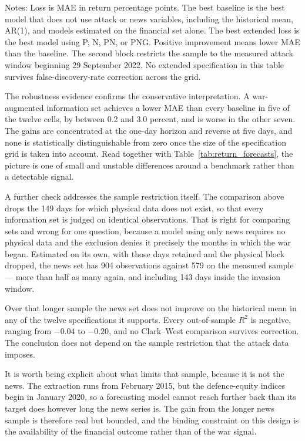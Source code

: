 \documentclass[12pt,a4paper]{article}
\begin{document}
\begin{table}[H]
\begin{threeparttable}
\begin{tablenotes}
\small
\item Notes: Loss is MAE in return percentage points. The best baseline is
the best model that does not use attack or news variables, including the
historical mean, AR(1), and models estimated on the financial set alone. The
best extended loss is the best model using P, N, PN, or PNG. Positive
improvement means lower MAE than the baseline. The second block restricts the
sample to the measured attack window beginning 29 September 2022. No extended
specification in this table survives false-discovery-rate correction across the
grid.
\end{tablenotes}

\end{threeparttable}
\end{table}

The robustness evidence confirms the conservative interpretation. A war-augmented information set achieves a lower MAE than every baseline in five of the twelve cells, by between 0.2 and 3.0 percent, and is worse in the other seven. The gains are concentrated at the one-day horizon and reverse at five days, and none is statistically distinguishable from zero once the size of the specification grid is taken into account. Read together with Table~\ref{tab:return_forecasts}, the picture is one of small and unstable differences around a benchmark rather than a detectable signal.

A further check addresses the sample restriction itself. The comparison above drops the 149 days for which physical data does not exist, so that every information set is judged on identical observations. That is right for comparing sets and wrong for one question, because a model using only news requires no physical data and the exclusion denies it precisely the months in which the war began. Estimated on its own, with those days retained and the physical block dropped, the news set has 904 observations against 579 on the measured sample --- more than half as many again, and including 143 days inside the invasion window.

Over that longer sample the news set does not improve on the historical mean in any of the twelve specifications it supports. Every out-of-sample $R^2$ is negative, ranging from $-0.04$ to $-0.20$, and no Clark--West comparison survives correction. The conclusion does not depend on the sample restriction that the attack data imposes.

It is worth being explicit about what limits that sample, because it is not the news. The extraction runs from February 2015, but the defence-equity indices begin in January 2020, so a forecasting model cannot reach further back than its target does however long the news series is. The gain from the longer news sample is therefore real but bounded, and the binding constraint on this design is the availability of the financial outcome rather than of the war signal.
\end{document}
